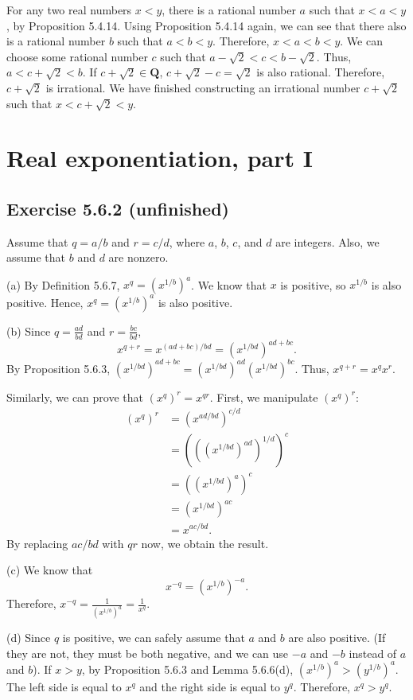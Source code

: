 \documentclass[12pt, oneside]{book}
\begin{document}
	For any two real numbers $x < y$, there is a rational number $a$ such that $x < a < y$, by Proposition 5.4.14. Using Proposition 5.4.14 again, we can see that there also is a rational number $b$ such that $a < b < y$. Therefore, $x < a < b < y$. We can choose some rational number $c$ such that $a - \sqrt{2} < c < b - \sqrt{2}$. Thus, $a < c + \sqrt{2} < b$. If $c + \sqrt{2} \in \mathbf{Q}$, $c + \sqrt{2} - c = \sqrt{2}$ is also rational. Therefore, $c + \sqrt{2}$ is irrational. We have finished constructing an irrational number $c + \sqrt{2}$ such that $x < c + \sqrt{2} < y$.
	
	\section{Real exponentiation, part I}
	
	\subsection*{Exercise 5.6.2 (unfinished)}
	
	Assume that $q = a / b$ and $r = c / d$, where $a$, $b$, $c$, and $d$ are integers. Also, we assume that $b$ and $d$ are nonzero.
	
	\bigskip
	\noindent (a) By Definition 5.6.7, $x^q = (x^{1 / b})^a$. We know that $x$ is positive, so $x^{1 / b}$ is also positive. Hence, $x^q = (x^{1 / b})^a$ is also positive.
	
	\bigskip
	\noindent (b) Since $q = \frac{ad}{bd}$ and $r = \frac{bc}{bd}$,
	\[x^{q + r} = x^{(ad + bc) / bd} = (x^{1 / bd})^{ad + bc}.\]
	By Proposition 5.6.3, $(x^{1 / bd})^{ad + bc} = (x^{1 / bd})^{ad} (x^{1 / bd})^{bc}$. Thus, $x^{q + r} = x^q x^r$.
	
	Similarly, we can prove that $(x^q)^r = x^{qr}$. First, we manipulate $(x^q)^r$:
	\[\begin{split}
		(x^q)^r &= (x^{ad / bd})^{c / d} \\
		&= (((x^{1 / bd})^{ad})^{1 / d})^c \\
		&= ((x^{1 / bd})^a)^c \\
		&= (x^{1 / bd})^{ac} \\
		&= x^{ac / bd}.
	\end{split}\]
	By replacing $ac / bd$ with $qr$ now, we obtain the result.
	
	\bigskip
	\noindent (c) We know that
	\[x^{-q} = (x^{1 / b})^{-a}.\]
	Therefore, $x^{-q} = \frac{1}{(x^{1 / b})^a} = \frac{1}{x^q}$.
	
	\bigskip
	\noindent (d) Since $q$ is positive, we can safely assume that $a$ and $b$ are also positive. (If they are not, they must be both negative, and we can use $-a$ and $-b$ instead of $a$ and $b$). If $x > y$, by Proposition 5.6.3 and Lemma 5.6.6(d), $(x^{1 / b})^a > (y^{1 / b})^a$. The left side is equal to $x^q$ and the right side is equal to $y^q$. Therefore, $x^q > y^q$.
	
\end{document}
